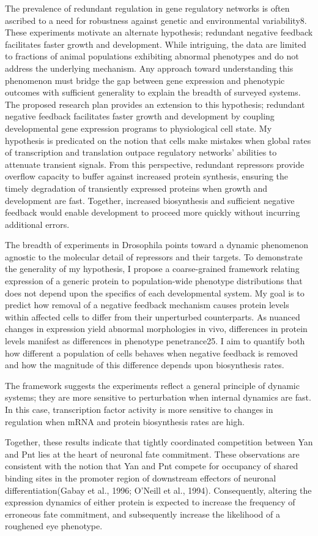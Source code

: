 The prevalence of redundant regulation in gene regulatory networks is often ascribed to a need for robustness against genetic and environmental variability8. These experiments motivate an alternate hypothesis; redundant negative feedback facilitates faster growth and development. While intriguing, the data are limited to fractions of animal populations exhibiting abnormal phenotypes and do not address the underlying mechanism. Any approach toward understanding this phenomenon must bridge the gap between gene expression and phenotypic outcomes with sufficient generality to explain the breadth of surveyed systems. The proposed research plan provides an extension to this hypothesis; redundant negative feedback facilitates faster growth and development by coupling developmental gene expression programs to physiological cell state. My hypothesis is predicated on the notion that cells make mistakes when global rates of transcription and translation outpace regulatory networks’ abilities to attenuate transient signals. From this perspective, redundant repressors provide overflow capacity to buffer against increased protein synthesis, ensuring the timely degradation of transiently expressed proteins when growth and development are fast. Together, increased biosynthesis and sufficient negative feedback would enable development to proceed more quickly without incurring additional errors.

The breadth of experiments in Drosophila points toward a dynamic phenomenon agnostic to the molecular detail of repressors and their targets. To demonstrate the generality of my hypothesis, I propose a coarse-grained framework relating expression of a generic protein to population-wide phenotype distributions that does not depend upon the specifics of each developmental system. My goal is to predict how removal of a negative feedback mechanism causes protein levels within affected cells to differ from their unperturbed counterparts. As nuanced changes in expression yield abnormal morphologies in vivo, differences in protein levels manifest as differences in phenotype penetrance25. I aim to quantify both how different a population of cells behaves when negative feedback is removed and how the magnitude of this difference depends upon biosynthesis rates.

The framework suggests the experiments reflect a general principle of dynamic systems; they are more sensitive to perturbation when internal dynamics are fast. In this case, transcription factor activity is more sensitive to changes in regulation when mRNA and protein biosynthesis rates are high.




Together, these results indicate that tightly coordinated competition between Yan and Pnt lies at the heart of neuronal fate commitment. These observations are consistent with the notion that Yan and Pnt compete for occupancy of shared binding sites in the promoter region of downstream effectors of neuronal differentiation(Gabay et al., 1996; O’Neill et al., 1994). Consequently, altering the expression dynamics of either protein is expected to increase the frequency of erroneous fate commitment, and subsequently increase the likelihood of a roughened eye phenotype. 